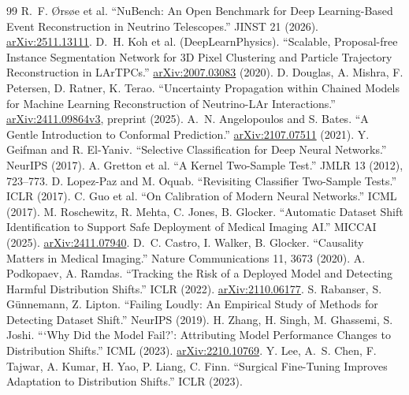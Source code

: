 \documentclass[10pt,twocolumn]{extarticle}
\begin{document}
\begin{thebibliography}{99}
\scriptsize
\setlength{\itemsep}{-1.6pt}\setlength{\parsep}{0pt}
 R.~F. \O rs\o e et al. ``NuBench: An Open Benchmark for Deep
Learning-Based Event Reconstruction in Neutrino Telescopes.'' JINST 21 (2026).
\href{https://arxiv.org/abs/2511.13111}{arXiv:2511.13111}.
 D.~H. Koh et al. (DeepLearnPhysics). ``Scalable,
Proposal-free Instance Segmentation Network for 3D Pixel Clustering and
Particle Trajectory Reconstruction in LArTPCs.''
\href{https://arxiv.org/abs/2007.03083}{arXiv:2007.03083} (2020).
 D. Douglas, A. Mishra, F. Petersen, D. Ratner,
K. Terao. ``Uncertainty Propagation within Chained Models for Machine Learning
Reconstruction of Neutrino-LAr Interactions.''
\href{https://arxiv.org/abs/2411.09864}{arXiv:2411.09864v3}, preprint (2025).
 A.~N. Angelopoulos and S. Bates. ``A Gentle
Introduction to Conformal Prediction.''
\href{https://arxiv.org/abs/2107.07511}{arXiv:2107.07511} (2021).
 Y. Geifman and R. El-Yaniv. ``Selective Classification
for Deep Neural Networks.'' NeurIPS (2017).
 A. Gretton et al. ``A Kernel Two-Sample Test.'' JMLR 13
(2012), 723--773.
 D. Lopez-Paz and M. Oquab. ``Revisiting Classifier
Two-Sample Tests.'' ICLR (2017).
 C. Guo et al. ``On Calibration of Modern Neural Networks.''
ICML (2017).
 M. Roschewitz, R. Mehta, C. Jones, B. Glocker.
``Automatic Dataset Shift Identification to Support Safe Deployment of Medical
Imaging AI.'' MICCAI (2025).
\href{https://arxiv.org/abs/2411.07940}{arXiv:2411.07940}.
 D.~C. Castro, I. Walker, B. Glocker. ``Causality Matters
in Medical Imaging.'' Nature Communications 11, 3673 (2020).
 A. Podkopaev, A. Ramdas. ``Tracking the Risk of a
Deployed Model and Detecting Harmful Distribution Shifts.'' ICLR (2022).
\href{https://arxiv.org/abs/2110.06177}{arXiv:2110.06177}.
 S. Rabanser, S. G\"unnemann, Z. Lipton. ``Failing
Loudly: An Empirical Study of Methods for Detecting Dataset Shift.'' NeurIPS
(2019).
 H. Zhang, H. Singh, M. Ghassemi, S. Joshi. ```Why Did the
Model Fail?': Attributing Model Performance Changes to Distribution Shifts.''
ICML (2023). \href{https://arxiv.org/abs/2210.10769}{arXiv:2210.10769}.
 Y. Lee, A.~S. Chen, F. Tajwar, A. Kumar, H. Yao,
P. Liang, C. Finn. ``Surgical Fine-Tuning Improves Adaptation to Distribution
Shifts.'' ICLR (2023).

\end{thebibliography}
\end{document}
